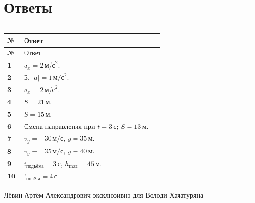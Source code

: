 \documentclass[a4paper,12pt]{article}
\newcommand{\sectionrule}{\par\vspace{0.25em}\noindent\color{accent}\rule{\linewidth}{0.55pt}\color{textgray}\par\vspace{0.25em}}
\newcommand{\ms}{\,\text{м/с}}
\newcommand{\mss}{\,\text{м/с}^2}
\newcommand{\metr}{\,\text{м}}
\newcommand{\secnd}{\,\text{с}}
\begin{document}
\clearpage
\section*{Ответы}
\sectionrule
\begin{longtable}{@{}>{\bfseries}p{0.10\linewidth}p{0.84\linewidth}@{}}
\toprule
№ & Ответ \\
\midrule
\endfirsthead
\toprule
№ & Ответ \\
\midrule
\endhead
1 & $a_x=2\mss$. \\
2 & Б, $|a|=1\mss$. \\
3 & $a_x=2\mss$. \\
4 & $S=21\metr$. \\
5 & $S=15\metr$. \\
6 & Смена направления при $t=3\secnd$; $S=13\metr$. \\
7 & $v_y=-30\ms$, $y=35\metr$. \\
8 & $v_y=-35\ms$, $y=40\metr$. \\
9 & $t_{\text{подъёма}}=3\secnd$, $h_{\max}=45\metr$. \\
10 & $t_{\text{полёта}}=4\secnd$. \\
\bottomrule
\end{longtable}

\vfill
\begin{center}
\small\color{darkaccent}
Лёвин Артём Александрович эксклюзивно для Володи Хачатуряна
\end{center}
\end{document}
